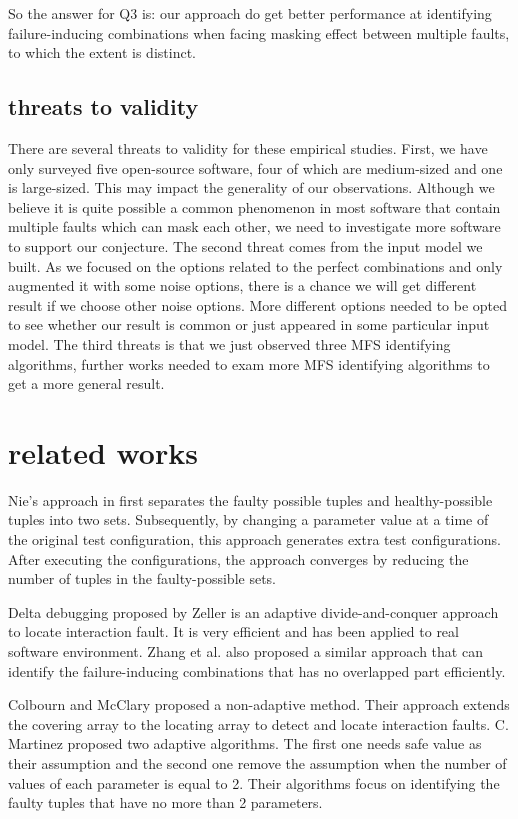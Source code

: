 \documentclass{sig-alternate}
\begin{document}
So the answer for Q3 is: our approach do get better performance at identifying failure-inducing combinations when facing masking effect between multiple faults, to which the extent is distinct.

\subsection{threats to validity}
There are several threats to validity for these empirical studies. First, we have only surveyed five open-source software, four of which are medium-sized and one is large-sized. This may impact the generality of our observations. Although we believe it is quite possible a common phenomenon in most software that contain multiple faults which can mask each other, we need to investigate more software to support our conjecture. The second threat comes from the input model we built. As we focused on the options related to the perfect combinations and only augmented it with some noise options, there is a chance we will get different result if we choose other noise options. More different options needed to be opted to see whether our result is common or just appeared in some particular input model. The third threats is that we just observed three MFS identifying algorithms, further works needed to exam more MFS identifying algorithms to get a more general result.

\section{related works}

Nie's approach in \cite{nie2011minimal} first separates the faulty possible tuples and healthy-possible tuples into two sets. Subsequently, by changing a parameter value at a time of the original test configuration, this approach generates extra test configurations. After executing the configurations, the approach converges by reducing the number of tuples in the faulty-possible sets.

Delta debugging \cite{zeller2002simplifying} proposed by Zeller is an adaptive divide-and-conquer approach to locate interaction fault. It is very efficient and has been applied to real software environment. Zhang et al. \cite{zhang2011characterizing} also proposed a similar approach that can identify the failure-inducing combinations that has no overlapped part efficiently.

Colbourn and McClary \cite{colbourn2008locating} proposed a non-adaptive method. Their approach extends the covering array to the locating array to detect and locate interaction faults. C. Martinez \cite{martinez2008algorithms,martinez2009locating} proposed two adaptive algorithms. The first one needs safe value as their assumption and the second one remove the assumption when the number of values of each parameter is equal to 2. Their algorithms focus on identifying the faulty tuples that have no more than 2 parameters.
\end{document}
